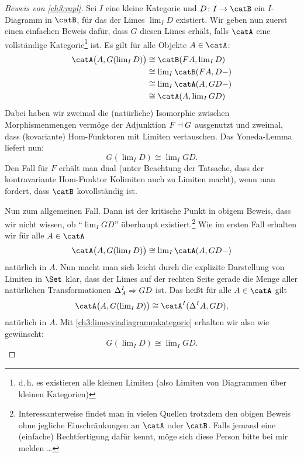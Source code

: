 \begin{proof}[Beweis von \cref{ch3:rapl}]
    Sei $I$ eine kleine Kategorie und $D\colon I\to\catB$ ein $I$-Diagramm
    in $\catB$, für das der Limes $\lim_I D$ existiert. 
    Wir geben nun zuerst einen einfachen Beweis dafür, dass $G$ diesen Limes
    erhält, falls $\catA$ eine vollständige Kategorie\footnote{d.\,h. es
    existieren alle kleinen Limiten (also Limiten von Diagrammen über kleinen
    Kategorien)} ist. Es gilt für alle Objekte $A\in\catA$:
    \begin{align*}
        \catA\bigl(A, G(\lim\nolimits_I D)\bigr)
        &\cong \catB(FA, \lim\nolimits_I D)          \\
        &\cong \lim\nolimits_I \catB(FA, D\blank)    \\
        &\cong \lim\nolimits_I \catA(A, GD\blank)    \\
        &\cong \catA(A,\lim\nolimits_I GD)
    \end{align*}
    Dabei haben wir zweimal die (natürliche) Isomorphie zwischen
    Morphismenmengen vermöge der Adjunktion $F\dashv G$ ausgenutzt und
    zweimal, dass (kovariante) Hom-Funktoren mit Limiten vertauschen. Das
    Yoneda-Lemma liefert nun: 
    \[ G(\lim\nolimits_I D) \cong \lim\nolimits_I GD  . \]
    Den Fall für $F$ erhält man dual (unter Beachtung der Tatsache, dass der
    kontravariante Hom-Funktor Kolimiten auch zu Limiten macht), wenn man
    fordert, dass $\catB$ kovollständig ist.
    
    \noindent
    Nun zum allgemeinen Fall.  Dann ist der kritische Punkt in obigem Beweis,
    dass wir nicht wissen, ob \enquote{$\lim_I GD$} überhaupt
    existiert.\footnote{%
        Interessanterweise findet man in vielen Quellen trotzdem den obigen
        Beweis ohne jegliche Einschränkungen an $\catA$ oder $\catB$. Falls
        jemand eine (einfache) Rechtfertigung dafür kennt, möge sich diese
        Person bitte bei mir melden \ldots%
    }
    Wie im ersten Fall erhalten wir für alle $A\in\catA$
    \[  \catA\bigl(A, G(\lim\nolimits_I D)\bigr)
        \cong \lim\nolimits_I \catA(A, GD\blank)
    \]
    natürlich in $A$. Nun macht man sich leicht durch die explizite Darstellung
    von Limiten in $\Set$ klar, dass der Limes auf der rechten Seite gerade die
    Menge aller natürlichen Transformationen $\Delta^I_A \mathrel{\Rightarrow} GD$ ist.
    Das heißt für alle $A\in\catA$ gilt
    \[ \catA\bigl(A, G(\lim\nolimits_I D)\bigr)
        \cong \catA^I(\Delta^I A, GD)
    , \]
    natürlich in $A$. Mit \cref{ch3:limesviadiagrammkategorie} erhalten wir also
    wie gewünscht:
    \[ G(\lim\nolimits_I D) \cong \lim\nolimits_I GD  . \]
\end{proof}

